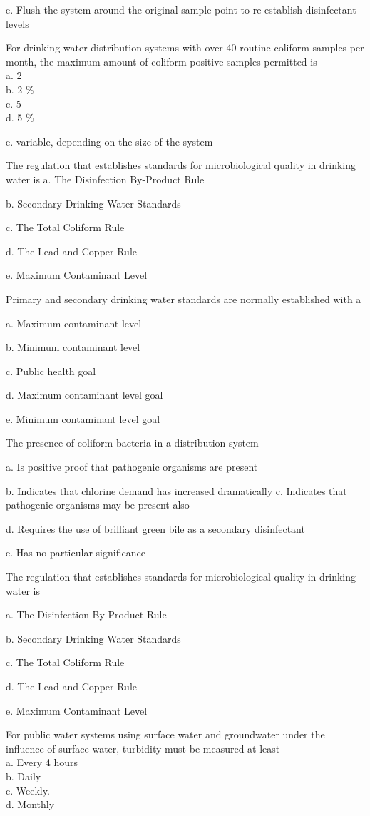 e. Flush the system around the original sample point to re-establish disinfectant levels

 For drinking water distribution systems with over 40 routine coliform samples per month, the maximum amount of coliform-positive samples permitted is\\
a. 2\\
b. 2 \%\\
c. 5\\
d. 5 \%

e. variable, depending on the size of the system

  The regulation that establishes standards for microbiological quality in drinking water is
a. The Disinfection By-Product Rule

b. Secondary Drinking Water Standards

c. The Total Coliform Rule

d. The Lead and Copper Rule

e. Maximum Contaminant Level


  Primary and secondary drinking water standards are normally established with a

a. Maximum contaminant level

b. Minimum contaminant level

c. Public health goal

d. Maximum contaminant level goal

e. Minimum contaminant level goal

The presence of coliform bacteria in a distribution system

a. Is positive proof that pathogenic organisms are present

b. Indicates that chlorine demand has increased dramatically 
c. Indicates that pathogenic organisms may be present also

d. Requires the use of brilliant green bile as a secondary disinfectant

e. Has no particular significance

The regulation that establishes standards for microbiological quality in drinking water is

a. The Disinfection By-Product Rule

b. Secondary Drinking Water Standards

c. The Total Coliform Rule

d. The Lead and Copper Rule

e. Maximum Contaminant Level

For public water systems using surface water and groundwater under the influence of surface water, turbidity must be measured at least\\
a. Every 4 hours\\
b. Daily\\
c. Weekly.\\
d. Monthly\\

